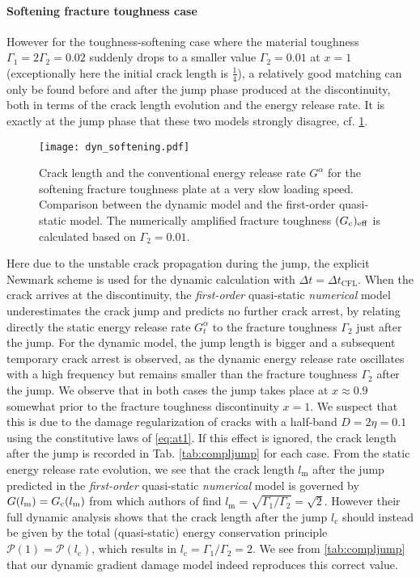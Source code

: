 \paragraph{Softening fracture toughness case} However for the toughness-softening case where the material toughness $\Gamma_1=2\Gamma_2=0.02$ suddenly drops to a smaller value $\Gamma_2=0.01$ at $x=1$ (exceptionally here the initial crack length is $\frac{1}{4}$), a relatively good matching can only be found before and after the jump phase produced at the discontinuity, both in terms of the crack length evolution and the energy release rate. It is exactly at the jump phase that these two models strongly disagree, cf. \cref{eq:ressoftening}.
\begin{figure}[htbp]
\centering
\texttt{[image: dyn\_softening.pdf]}
\caption{Crack length and the conventional energy release rate $G^\alpha$ for the softening fracture toughness plate at a very slow loading speed. Comparison between the dynamic model and the first-order quasi-static model. The numerically amplified fracture toughness $(G_\mathrm{c})_\mathrm{eff}$ is calculated based on $\Gamma_2=0.01$.} \label{eq:ressoftening}
\end{figure}
Here due to the unstable crack propagation during the jump, the explicit Newmark scheme is used for the dynamic calculation with $\Delta t=\Delta t_\mathrm{CFL}$. When the crack arrives at the discontinuity, the \emph{first-order} quasi-static \emph{numerical} model underestimates the crack jump and predicts no further crack arrest, by relating directly the static energy release rate $G^\alpha_t$ to the fracture toughness $\Gamma_2$ just after the jump. For the dynamic model, the jump length is bigger and a subsequent temporary crack arrest is observed, as the dynamic energy release rate oscillates with a high frequency but remains smaller than the fracture toughness $\Gamma_2$ after the jump. We observe that in both cases the jump takes place at $x\approx 0.9$ somewhat prior to the fracture toughness discontinuity $x=1$. We suspect that this is due to the damage regularization of cracks with a half-band $D=2\eta=0.1$ using the constitutive laws of \eqref{eq:at1}. If this effect is ignored, the crack length after the jump is recorded in Tab. \ref{tab:compljump} for each case. From the static energy release rate evolution, we see that the crack length $l_\mathrm{m}$ after the jump predicted in the \emph{first-order} quasi-static \emph{numerical} model is governed by $G(l_\mathrm{m})=G_\mathrm{c}(l_\mathrm{m})$ from which authors of \cite{DumouchelMarigoCharlotte:2008} find $l_\mathrm{m}=\sqrt{\Gamma_1/\Gamma_2}=\sqrt{2}$. However their full dynamic analysis shows that the crack length after the jump $l_\mathrm{c}$ should instead be given by the total (quasi-static) energy conservation principle $\mathcal{P}(1)=\mathcal{P}(l_\mathrm{c})$, which results in $l_\mathrm{c}=\Gamma_1/\Gamma_2=2$. We see from \cref{tab:compljump} that our dynamic gradient damage model indeed reproduces this correct value.
